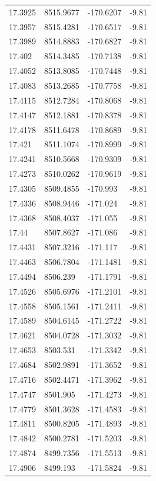 \begin{table}[H]
\begin{tabular}{llll}
17.3925 & 8515.9677 & -170.6207 & -9.81 \\
17.3957 & 8515.4281 & -170.6517 & -9.81 \\
17.3989 & 8514.8883 & -170.6827 & -9.81 \\
17.402 & 8514.3485 & -170.7138 & -9.81 \\
17.4052 & 8513.8085 & -170.7448 & -9.81 \\
17.4083 & 8513.2685 & -170.7758 & -9.81 \\
17.4115 & 8512.7284 & -170.8068 & -9.81 \\
17.4147 & 8512.1881 & -170.8378 & -9.81 \\
17.4178 & 8511.6478 & -170.8689 & -9.81 \\
17.421 & 8511.1074 & -170.8999 & -9.81 \\
17.4241 & 8510.5668 & -170.9309 & -9.81 \\
17.4273 & 8510.0262 & -170.9619 & -9.81 \\
17.4305 & 8509.4855 & -170.993 & -9.81 \\
17.4336 & 8508.9446 & -171.024 & -9.81 \\
17.4368 & 8508.4037 & -171.055 & -9.81 \\
17.44 & 8507.8627 & -171.086 & -9.81 \\
17.4431 & 8507.3216 & -171.117 & -9.81 \\
17.4463 & 8506.7804 & -171.1481 & -9.81 \\
17.4494 & 8506.239 & -171.1791 & -9.81 \\
17.4526 & 8505.6976 & -171.2101 & -9.81 \\
17.4558 & 8505.1561 & -171.2411 & -9.81 \\
17.4589 & 8504.6145 & -171.2722 & -9.81 \\
17.4621 & 8504.0728 & -171.3032 & -9.81 \\
17.4653 & 8503.531 & -171.3342 & -9.81 \\
17.4684 & 8502.9891 & -171.3652 & -9.81 \\
17.4716 & 8502.4471 & -171.3962 & -9.81 \\
17.4747 & 8501.905 & -171.4273 & -9.81 \\
17.4779 & 8501.3628 & -171.4583 & -9.81 \\
17.4811 & 8500.8205 & -171.4893 & -9.81 \\
17.4842 & 8500.2781 & -171.5203 & -9.81 \\
17.4874 & 8499.7356 & -171.5513 & -9.81 \\
17.4906 & 8499.193 & -171.5824 & -9.81 \\

\end{tabular}
\end{table}
